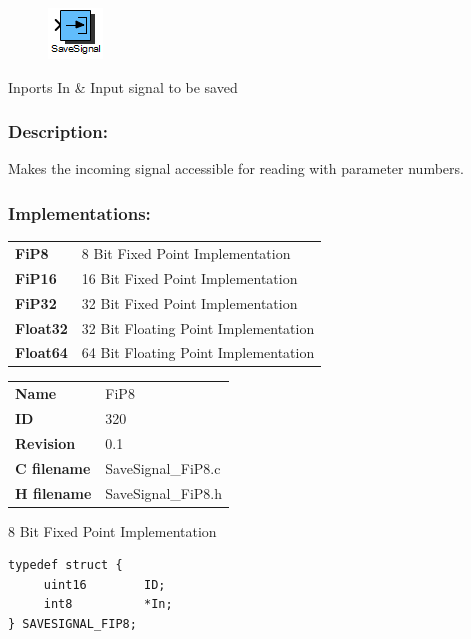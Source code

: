 \label{block:SaveSignal}
\begin{figure}[H]\includegraphics{SaveSignal}\end{figure} 

\begin{XtoCtabular}{Inports}
In & Input signal to be saved\tabularnewline
\hline
\end{XtoCtabular}


\subsubsection*{Description:}
Makes the incoming signal accessible for reading with parameter numbers.


\subsubsection*{Implementations:}
\begin{tabular}{l l}
\textbf{FiP8} & 8 Bit Fixed Point Implementation\tabularnewline
\textbf{FiP16} & 16 Bit Fixed Point Implementation\tabularnewline
\textbf{FiP32} & 32 Bit Fixed Point Implementation\tabularnewline
\textbf{Float32} & 32 Bit Floating Point Implementation\tabularnewline
\textbf{Float64} & 64 Bit Floating Point Implementation\tabularnewline
\end{tabular}

\nopagebreak[0]
\begin{tabular}{l l}
\textbf{Name} & FiP8 \tabularnewline
\textbf{ID} & 320 \tabularnewline
\textbf{Revision} & 0.1 \tabularnewline
\textbf{C filename} & SaveSignal\_FiP8.c \tabularnewline
\textbf{H filename} & SaveSignal\_FiP8.h \tabularnewline
\end{tabular}
\vspace{1ex}

8 Bit Fixed Point Implementation

\begin{lstlisting}
typedef struct {
     uint16        ID;
     int8          *In;
} SAVESIGNAL_FIP8;
\end{lstlisting}

